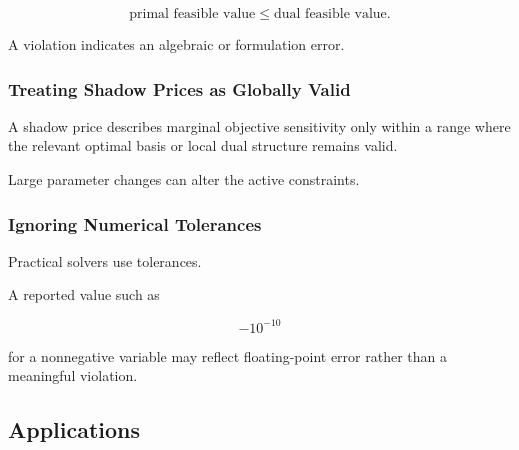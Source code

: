 \[
\boxed{
\text{primal feasible value}
\leq
\text{dual feasible value}.
}
\]

A violation indicates an algebraic or formulation error.

\subsubsection{Treating Shadow Prices as Globally Valid}

A shadow price describes marginal objective sensitivity only within a
range where the relevant optimal basis or local dual structure remains
valid.

Large parameter changes can alter the active constraints.

\subsubsection{Ignoring Numerical Tolerances}

Practical solvers use tolerances.

A reported value such as

\[
-10^{-10}
\]

for a nonnegative variable may reflect floating-point error rather than a
meaningful violation.

\subsection{Applications}
\label{subsec:linear-programming-applications}

